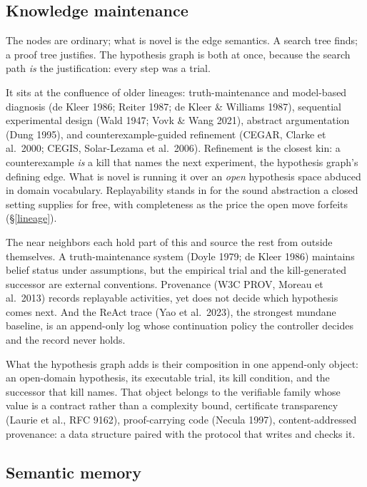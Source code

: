 \documentclass[
  10pt,
]{article}
\begin{document}
\subsection{Knowledge maintenance}\label{knowledge-maintenance}

The nodes are ordinary; what is novel is the edge semantics. A search
tree finds; a proof tree justifies. The hypothesis graph is both at
once, because the search path \emph{is} the justification: every step
was a trial.

It sits at the confluence of older lineages: truth-maintenance and
model-based diagnosis (de Kleer 1986; Reiter 1987; de Kleer \& Williams
1987), sequential experimental design (Wald 1947; Vovk \& Wang 2021),
abstract argumentation (Dung 1995), and counterexample-guided refinement
(CEGAR, Clarke et al.~2000; CEGIS, Solar-Lezama et al.~2006). Refinement
is the closest kin: a counterexample \emph{is} a kill that names the
next experiment, the hypothesis graph's defining edge. What is novel is
running it over an \emph{open} hypothesis space abduced in domain
vocabulary. Replayability stands in for the sound abstraction a closed
setting supplies for free, with completeness as the price the open move
forfeits (\S\ref{lineage}).

The near neighbors each hold part of this and source the rest from
outside themselves. A truth-maintenance system (Doyle 1979; de Kleer
1986) maintains belief status under assumptions, but the empirical trial
and the kill-generated successor are external conventions. Provenance
(W3C PROV, Moreau et al.~2013) records replayable activities, yet does
not decide which hypothesis comes next. And the ReAct trace (Yao et
al.~2023), the strongest mundane baseline, is an append-only log whose
continuation policy the controller decides and the record never holds.

What the hypothesis graph adds is their composition in one append-only
object: an open-domain hypothesis, its executable trial, its kill
condition, and the successor that kill names. That object belongs to the
verifiable family whose value is a contract rather than a complexity
bound, certificate transparency (Laurie et al., RFC 9162),
proof-carrying code (Necula 1997), content-addressed provenance: a data
structure paired with the protocol that writes and checks it.

\subsection{Semantic memory}\label{semantic-memory}
\end{document}
